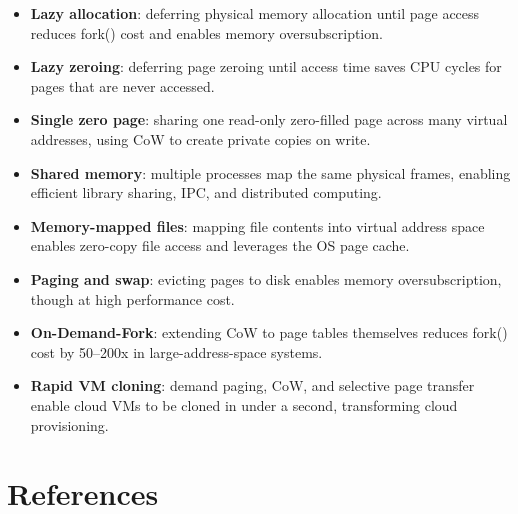 \documentclass[11pt]{article}
\begin{document}
\begin{itemize}
    \item \textbf{Lazy allocation}: deferring physical memory allocation until page access reduces fork() cost and enables memory oversubscription.
    \item \textbf{Lazy zeroing}: deferring page zeroing until access time saves CPU cycles for pages that are never accessed.
    \item \textbf{Single zero page}: sharing one read-only zero-filled page across many virtual addresses, using CoW to create private copies on write.
    \item \textbf{Shared memory}: multiple processes map the same physical frames, enabling efficient library sharing, IPC, and distributed computing.
    \item \textbf{Memory-mapped files}: mapping file contents into virtual address space enables zero-copy file access and leverages the OS page cache.
    \item \textbf{Paging and swap}: evicting pages to disk enables memory oversubscription, though at high performance cost.
    \item \textbf{On-Demand-Fork}: extending CoW to page tables themselves reduces fork() cost by 50--200x in large-address-space systems.
    \item \textbf{Rapid VM cloning}: demand paging, CoW, and selective page transfer enable cloud VMs to be cloned in under a second, transforming cloud provisioning.
\end{itemize}

\section{References}
\end{document}

